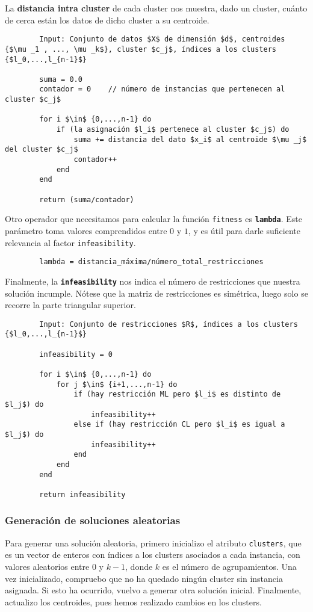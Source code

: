		La \textbf{distancia intra cluster} de cada cluster nos muestra, dado un cluster, cuánto de cerca están los datos de dicho cluster a su centroide.

		\footnotesize
		\begin{lstlisting}
		Input: Conjunto de datos $X$ de dimensión $d$, centroides {$\mu _1 , ..., \mu _k$}, cluster $c_j$, índices a los clusters {$l_0,...,l_{n-1}$}

		suma = 0.0
		contador = 0	// número de instancias que pertenecen al cluster $c_j$

		for i $\in$ {0,...,n-1} do
			if (la asignación $l_i$ pertenece al cluster $c_j$) do
				suma += distancia del dato $x_i$ al centroide $\mu _j$ del cluster $c_j$
				contador++
			end
		end

		return (suma/contador)
		\end{lstlisting}
		\normalsize

		Otro operador que necesitamos para calcular la función \lstinline!fitness! es \textbf{\lstinline!lambda!}.
		Este parámetro toma valores comprendidos entre $0$ y $1$, y es útil para darle suficiente relevancia al factor \lstinline!infeasibility!. 

		\footnotesize
		\begin{lstlisting}
		lambda = distancia_máxima/número_total_restricciones
		\end{lstlisting}
		\normalsize

		Finalmente, la \textbf{\lstinline!infeasibility!} nos indica el número de restricciones que nuestra solución incumple.
		Nótese que la matriz de restricciones es simétrica, luego solo se recorre la parte triangular superior.

		\newpage

		\footnotesize
		\begin{lstlisting}
		Input: Conjunto de restricciones $R$, índices a los clusters {$l_0,...,l_{n-1}$}

		infeasibility = 0

		for i $\in$ {0,...,n-1} do
			for j $\in$ {i+1,...,n-1} do
				if (hay restricción ML pero $l_i$ es distinto de $l_j$) do
					infeasibility++
				else if (hay restricción CL pero $l_i$ es igual a $l_j$) do
					infeasibility++
				end
			end
		end

		return infeasibility
		\end{lstlisting}
		\normalsize

		\subsubsection{Generación de soluciones aleatorias}
		Para generar una solución aleatoria, primero inicializo el atributo \lstinline!clusters!, que 
		es un vector de enteros con índices a los clusters asociados a cada instancia, con valores aleatorios entre $0$ y $k-1$, 
		donde $k$ es el número de agrupamientos. Una vez inicializado, compruebo que no ha quedado ningún cluster sin instancia asignada.
		Si esto ha ocurrido, vuelvo a generar otra solución inicial. Finalmente, actualizo los centroides, pues hemos realizado cambios en los clusters.

